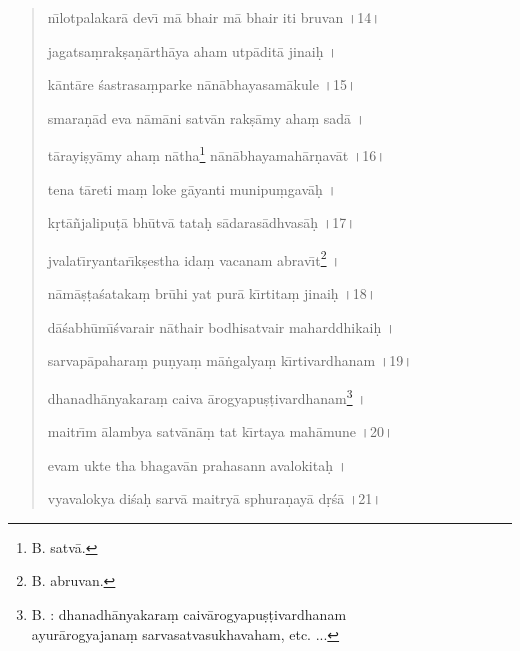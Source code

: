 \documentclass[a4paper, 11pt, oneside, french, landscape, twocolumn]{article}
\begin{document}
\begin{quotation}
n\={\i}lotpalakar\={a} dev\={\i} m\={a} bhair m\={a} bhair iti bruvan \texthindi{।}14\texthindi{।}

\bigskip

jagatsa\d{m}rak\d{s}a\d{n}\={a}rth\={a}ya aham utp\={a}dit\={a} jinai\d{h} \texthindi{।}

k\={a}nt\={a}re \'{s}astrasa\d{m}parke n\={a}n\={a}bhayasam\={a}kule \texthindi{।}15\texthindi{।}

\bigskip

smara\d{n}\={a}d eva n\={a}m\={a}ni satv\={a}n rak\d{s}\={a}my aha\d{m} sad\={a} \texthindi{।}

t\={a}rayi\d{s}y\={a}my aha\d{m} n\={a}tha\footnote{B. satv\={a}.} n\={a}n\={a}bhayamah\={a}r\d{n}av\={a}t \texthindi{।}16\texthindi{।}

\bigskip

tena t\={a}reti ma\d{m} loke g\={a}yanti munipu\d{m}gav\={a}\d{h} \texthindi{।}

k\d{r}t\={a}\~{n}jalipu\d{t}\={a} bh\={u}tv\={a} tata\d{h} s\={a}daras\={a}dhvas\={a}\d{h} \texthindi{।}17\texthindi{।}

\bigskip

jvalat\={\i}ryantar\={\i}k\d{s}estha ida\d{m} vacanam abrav\={\i}t\footnote{B. abruvan.} \texthindi{।}

n\={a}m\={a}\d{s}\d{t}a\'{s}ataka\d{m} br\={u}hi yat pur\={a} k\={\i}rtita\d{m} jinai\d{h} \texthindi{।}18\texthindi{।}

\bigskip

d\={a}\'{s}abh\={u}m\={\i}\'{s}varair n\={a}thair bodhisatvair maharddhikai\d{h} \texthindi{।}

sarvap\={a}pahara\d{m} pu\d{n}ya\d{m} m\={a}\.{n}galya\d{m} k\={\i}rtivardhanam \texthindi{।}19\texthindi{।}

\bigskip

dhanadh\={a}nyakara\d{m} caiva \={a}rogyapu\d{s}\d{t}ivardhanam\footnote{B. : dhanadh\={a}nyakara\d{m} caiv\={a}rogyapu\d{s}\d{t}ivardhanam\\\hspace*{10mm}ayur\={a}rogyajana\d{m} sarvasatvasukhavaham, etc. ...} \texthindi{।}

maitr\={\i}m \={a}lambya satv\={a}n\={a}\d{m} tat k\={\i}rtaya mah\={a}mune \texthindi{।}20\texthindi{।}

\bigskip

evam ukte tha bhagav\={a}n prahasann avalokita\d{h} \texthindi{।}

vyavalokya di\'{s}a\d{h} sarv\={a} maitry\={a} sphura\d{n}ay\={a} d\d{r}\'{s}\={a} \texthindi{।}21\texthindi{।}


\end{quotation}
\end{document}

